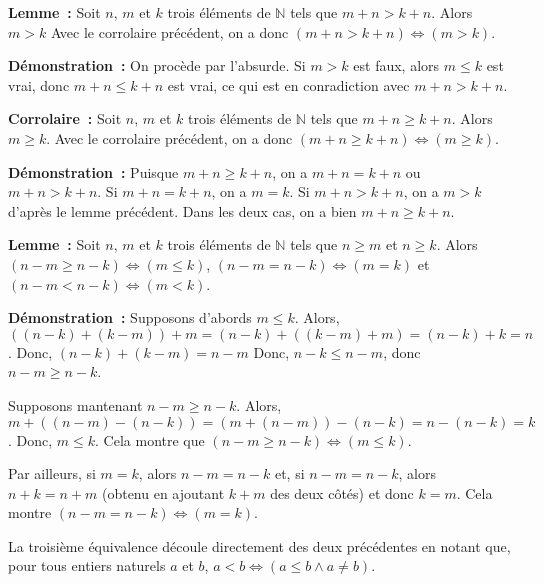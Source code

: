     \done

\medskip

\noindent\textbf{Lemme :} Soit $n$, $m$ et $k$ trois éléments de $\mathbb{N}$ tels que $m+n > k+n$. 
    Alors $m > k$
    Avec le corrolaire précédent, on a donc $(m+n > k+n) \Leftrightarrow (m > k)$.

\medskip

\noindent\textbf{Démonstration :} 
    On procède par l'absurde. 
    Si $m > k$ est faux, alors $m \leq k$ est vrai, donc $m + n \leq k + n$ est vrai, ce qui est en conradiction avec $m+n > k+n$.

   \done 

\medskip

\noindent\textbf{Corrolaire :} Soit $n$, $m$ et $k$ trois éléments de $\mathbb{N}$ tels que $m+n \geq k+n$. 
    Alors $m \geq k$.
    Avec le corrolaire précédent, on a donc $(m+n \geq k+n) \Leftrightarrow (m \geq k)$.

\medskip

\noindent\textbf{Démonstration :} 
    Puisque $m + n \geq k + n$, on a $m + n = k + n$ ou $m + n > k + n$.
    Si $m + n = k + n$, on a $m = k$.
    Si $m + n > k + n$, on a $m > k$ d'après le lemme précédent.
    Dans les deux cas, on a bien $m + n \geq k + n$.

   \done 

\medskip

\noindent\textbf{Lemme :} Soit $n$, $m$ et $k$ trois éléments de $\mathbb{N}$ tels que $n \geq m$ et $n \geq k$. 
    Alors $(n-m \geq n-k) \Leftrightarrow (m \leq k)$, $(n-m = n-k) \Leftrightarrow (m = k)$ et $(n-m < n-k) \Leftrightarrow (m < k)$.

\medskip

\noindent\textbf{Démonstration :} 
    Supposons d'abords $m \leq k$. 
    Alors, $((n-k) + (k-m)) + m = (n-k) + ((k-m) + m) = (n-k) + k = n$. 
    Donc, $(n-k) + (k-m) = n - m$
    Donc, $n-k \leq n-m$, donc $n-m \geq n-k$. 

    Supposons mantenant $n-m \geq n-k$. 
    Alors, $m + ((n-m) - (n-k)) = (m + (n-m)) - (n-k) = n - (n-k) = k$. 
    Donc, $m \leq k$.
    Cela montre que $(n-m \geq n-k) \Leftrightarrow (m \leq k)$.
    
    Par ailleurs, si $m = k$, alors $n-m = n-k$ et, si $n - m = n - k$, alors $n + k = n + m$ (obtenu en ajoutant $k+m$ des deux côtés) et donc $k = m$. 
    Cela montre $(n-m = n-k) \Leftrightarrow (m = k)$. 

    La troisième équivalence découle directement des deux précédentes en notant que, pour tous entiers naturels $a$ et $b$, $a < b \Leftrightarrow (a \leq b \wedge a \neq b)$. 
    
